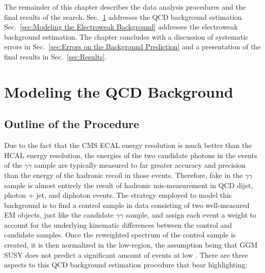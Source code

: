 \documentclass[dissertation.tex]{subfiles}
\begin{document}
The remainder of this chapter describes the data analysis procedures and the final results of the search.  Sec.~\ref{sec:Modeling the QCD Background} addresses the QCD background estimation.  Sec.~\ref{sec:Modeling the Electroweak Background} addresses the electroweak background estimation.  The chapter concludes with a discussion of systematic errors in Sec.~\ref{sec:Errors on the Background Prediction} and a presentation of the final results in Sec.~\ref{sec:Results}.

\section{Modeling the QCD Background}
\label{sec:Modeling the QCD Background}

\subsection{Outline of the Procedure}
\label{sec:Outline of the Procedure}

Due to the fact that the CMS ECAL energy resolution is much better than the HCAL energy resolution, the energies of the two candidate photons in the events of the $\gamma\gamma$ sample are typically measured to far greater accuracy and precision than the energy of the hadronic recoil in those events.  Therefore, fake \MET in the $\gamma\gamma$ sample is almost entirely the result of hadronic mis-measurement in QCD dijet, photon + jet, and diphoton events.  The strategy employed to model this background is to find a control sample in data consisting of two well-measured EM objects, just like the candidate $\gamma\gamma$ sample, and assign each event a weight to account for the underlying kinematic differences between the control and candidate samples.  Once the reweighted \MET spectrum of the control sample is created, it is then normalized in the low-\MET region, the assumption being that GGM SUSY does not predict a significant amount of events at low \MET.  There are three aspects to this QCD background estimation procedure that bear highlighting:
\end{document}
